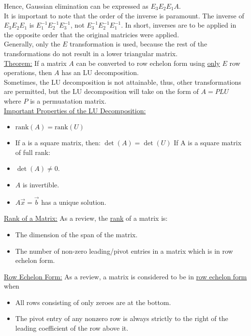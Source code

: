 \documentclass{article}
\newcommand{\gap}{\medskip\\}
\begin{document}
    Hence, Gaussian elimination can be expressed as $E_3E_2E_1A$.
    \gap
    It is important to note that the order of the inverse is paramount. The inverse
    of $E_3E_2E_1$ is $E_1^{-1}E_2^{-1}E_3^{-1}$, not $E_3^{-1}E_2^{-1}E_1^{-1}$.
    In short, inverses are to be applied in the opposite order that the original
    matricies were applied.
    \gap
    Generally, only the $E$ transformation is used, because the rest of the transformations
    do not result in a lower triangular matrix.
    \gap
    \underline{Theorem:} If a matrix $A$ can be converted to row echelon form using
    \underline{only} $E$ row operations, then $A$ has an LU decomposition.
    \gap
    Sometimes, the LU decomposition is not attainable, thus, other transformations
    are permitted, but the LU decomposition will take on the form of $A=PLU$ where $P$
    is a permuatation matrix.
    \gap

    \underline{Important Properties of the LU Decomposition:}
    \begin{itemize}
        \item $\textrm{rank}(A) = \textrm{rank}(U)$
        \item If a is a square matrix, then: $\det(A) = \det(U)$
        If A is a square matrix of full rank:
        \item $\det(A) \neq 0$.
        \item $A$ is invertible.
        \item $A\vec{x} = \vec{b}$ has a unique solution.
    \end{itemize}

    \underline{Rank of a Matrix:} As a review, the \underline{rank} of a matrix is:
    \begin{itemize}
        \item The dimension of the span of the matrix.
        \item The number of non-zero leading/pivot entries in a matrix which is
                in row echelon form.
    \end{itemize}

    \underline{Row Echelon Form:} As a review, a matrix is considered to be in \underline{row echelon form}
    when 
    \begin{itemize}
        \item All rows consisting of only zeroes are at the bottom.
        \item The pivot entry of any nonzero row is always strictly to the right of the
            leading coefficient of the row above it.
    \end{itemize}
\end{document}
